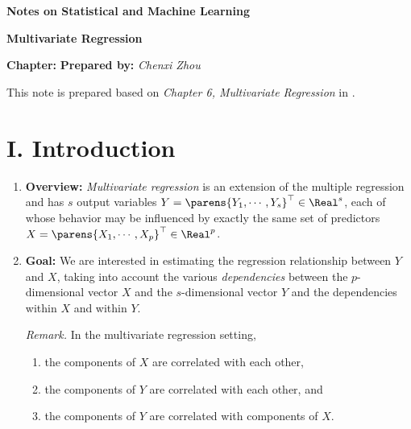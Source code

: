 \documentclass[12pt]{article}
\newcommand{\titlebox}[4]{
\begin{tcolorbox}[colback = blue!5!white!95, colframe = blue!70!black
]
  \noindent \textbf{ #1 } \hfill \textit{#2} 
  \begin{center}
  	 \LARGE{\textbf{#3}}
  \end{center}
\textbf{Chapter:} \text{\textit{#4}} \hfill \textbf{Prepared by:} \textit{Chenxi Zhou}
\end{tcolorbox}
}
\begin{document}
\thispagestyle{plain}
\titlebox{Notes on Statistical and Machine Learning}{}{Multivariate Regression}{6}

\vspace{10pt} 

This note is prepared based on \textit{Chapter 6, Multivariate Regression} in \textcite{Izenman2009-jk}. 

\section*{I. Introduction}

\begin{enumerate}[label=\textbf{\arabic*.}]
	
	\item \textbf{Overview:} \textit{Multivariate regression} is an extension of the multiple regression and has $s$ output variables $Y = \parens{Y_1, \cdots, Y_s}^\top \in \Real^s$, each of whose behavior may be influenced by exactly the same set of predictors $X = \parens{X_1, \cdots, X_p}^\top \in \Real^p$. 

	
	\item \textbf{Goal:} We are interested in estimating the regression relationship between $Y$ and $X$, taking into account the various \textit{dependencies} between the $p$-dimensional vector $X$ and the $s$-dimensional vector $Y$ and the dependencies within $X$ and within $Y$. 
	
	\textit{Remark.} In the multivariate regression setting, 
	\begin{enumerate}
		\item the components of $X$ are correlated with each other, 
		\item the components of $Y$ are correlated with each other, and 
		\item the components of $Y$ are correlated with components of $X$. 
	\end{enumerate}
\end{enumerate}
\end{document}
